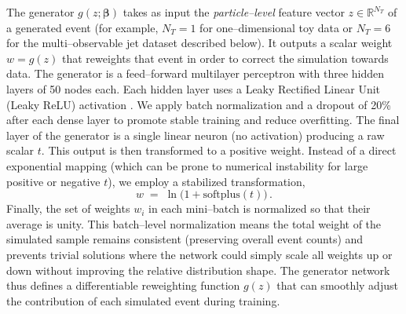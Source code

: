 {{        The generator $g(z;\boldsymbol{\beta})$ takes as input the \emph{particle--level} feature vector $z \in \mathbb{R}^{N_T}$ of a generated event (for example, $N_T=1$ for one--dimensional toy data or $N_T=6$ for the multi--observable jet dataset described below).
        It outputs a scalar weight $w=g(z)$ that reweights that event in order to correct the simulation towards data.
        The generator is a feed--forward multilayer perceptron with three hidden layers of 50 nodes each.
        Each hidden layer uses a Leaky Rectified Linear Unit (Leaky ReLU) activation .
        We apply batch normalization and a dropout of 20\% after each dense layer to promote stable training and reduce overfitting.
        The final layer of the generator is a single linear neuron (no activation) producing a raw scalar $t$.
        This output is then transformed to a positive weight.
        Instead of a direct exponential mapping (which can be prone to numerical instability for large positive or negative $t$), we employ a stabilized transformation,
        \[ 
            w \;=\; \ln\!\Big(1 + \text{softplus}(t)\Big)\,.
        \]
         Finally, the set of weights ${w_i}$ in each mini--batch is normalized so that their average is unity.
         This batch--level normalization means the total weight of the simulated sample remains consistent (preserving overall event counts) and prevents trivial solutions where the network could simply scale all weights up or down without improving the relative distribution shape.
         The generator network thus defines a differentiable reweighting function $g(z)$ that can smoothly adjust the contribution of each simulated event during training.

}}
